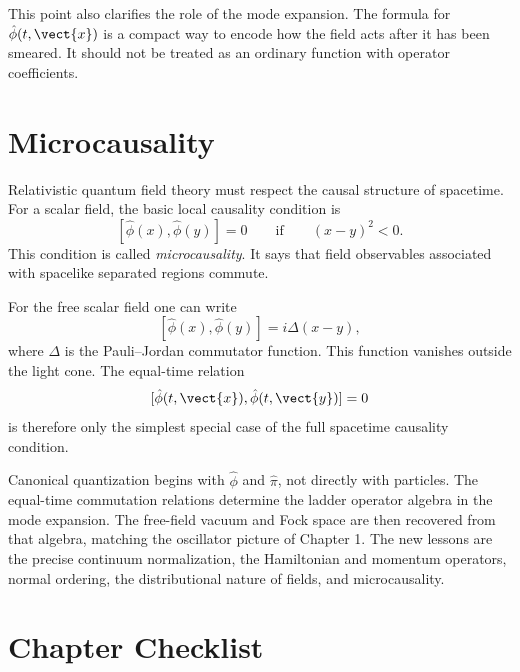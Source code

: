 This point also clarifies the role of the mode expansion. The formula for
\(\hat\phi(t,\vect{x})\) is a compact way to encode how the field acts after it
has been smeared. It should not be treated as an ordinary function with operator
coefficients.

\section{Microcausality}

Relativistic quantum field theory must respect the causal structure of
spacetime. For a scalar field, the basic local causality condition is
\[
    [\hat\phi(x),\hat\phi(y)]=0
    \qquad \text{if}\qquad (x-y)^2<0.
\]
This condition is called \emph{microcausality}. It says that field observables
associated with spacelike separated regions commute.

For the free scalar field one can write
\[
    [\hat\phi(x),\hat\phi(y)]
    = i\Delta(x-y),
\]
where \(\Delta\) is the Pauli--Jordan commutator function. This function
vanishes outside the light cone. The equal-time relation
\[
    [\hat\phi(t,\vect{x}),\hat\phi(t,\vect{y})]=0
\]
is therefore only the simplest special case of the full spacetime causality
condition.

\begin{summarybox}
Canonical quantization begins with \(\hat\phi\) and \(\hat\pi\), not directly
with particles. The equal-time commutation relations determine the ladder
operator algebra in the mode expansion. The free-field vacuum and Fock space are
then recovered from that algebra, matching the oscillator picture of Chapter 1.
The new lessons are the precise continuum normalization, the Hamiltonian and
momentum operators, normal ordering, the distributional nature of fields, and
microcausality.
\end{summarybox}

\section{Chapter Checklist}

